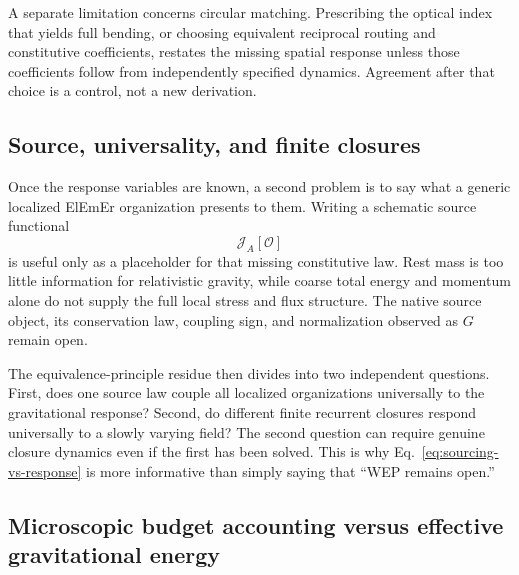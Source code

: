 \documentclass[11pt]{article}
\newcommand{\ElEmEr}{\mbox{ElEmEr}}
\theoremstyle{plain}
\theoremstyle{remark}
\begin{document}
A separate limitation concerns circular matching.  Prescribing the
optical index that yields full bending, or choosing equivalent reciprocal
routing and constitutive coefficients, restates the missing spatial
response unless those coefficients follow from independently specified
dynamics.  Agreement after that choice is a control, not a new derivation.

\subsection{Source, universality, and finite closures}

Once the response variables are known, a second problem is to say what a generic localized
\ElEmEr{} organization presents to them.  Writing a schematic source functional
\begin{equation}
\mathcal J_A[\mathcal O]
\end{equation}
is useful only as a placeholder for that missing constitutive law.  Rest mass is too little
information for relativistic gravity, while coarse total energy and momentum alone do not
supply the full local stress and flux structure.  The native source object, its conservation
law, coupling sign, and normalization observed as $G$ remain open.

The equivalence-principle residue then divides into two independent questions.  First, does
one source law couple all localized organizations universally to the gravitational response?
Second, do different finite recurrent closures respond universally to a slowly varying field?
The second question can require genuine closure dynamics even if the first has been solved.
This is why Eq.~\eqref{eq:sourcing-vs-response} is more informative than simply saying that
``WEP remains open.''

\subsection{Microscopic budget accounting versus effective gravitational energy}
\label{sec:micro-effective-energy}
\end{document}
